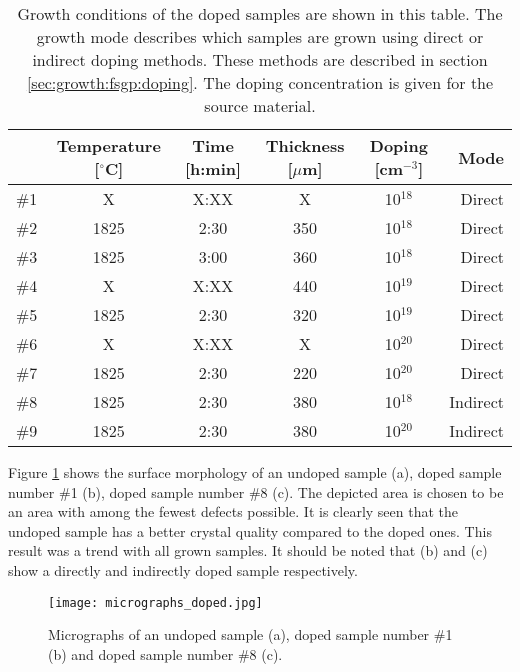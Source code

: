 \begin{table}[h]
\caption{Growth conditions of the doped samples are shown in this table. The growth mode describes which samples are grown using direct or indirect doping methods. These methods are described in section \ref{sec:growth:fsgp:doping}. The doping concentration is given for the source material.} 
\label{tab:doped_samples}
\begin{center}
\begin{tabular}{l c c c c r}
  \hline                       
  \hline       
  \vspace{1mm}
   & \small{Temperature [$^\circ$C]} & \small{Time [h:min]} & \small{Thickness [$\mu$m]} & \small{Doping [cm$^{-3}$]} & Mode\\
    \hline
  \#1 & X & X:XX & X & 10$^{18}$&Direct\\ %
  \#2 & 1825 & 2:30 & 350 & 10$^{18}$&Direct\\ %
  \#3 & 1825 & 3:00 & 360 & 10$^{18}$&Direct\\	%
  \#4 & X & X:XX & 440 & 10$^{19}$&Direct\\ %
  \#5 & 1825 & 2:30 & 320 & 10$^{19}$&Direct\\ %
  \#6 & X & X:XX & X & 10$^{20}$&Direct\\%
  \#7 & 1825 & 2:30 & 220 & 10$^{20}$&Direct\\%
  \#8 & 1825 & 2:30 & 380 & 10$^{18}$&Indirect\\%
  \#9 & 1825 & 2:30 & 380 & 10$^{20}$&Indirect\\%
  
  \hline  
\end{tabular}
\end{center}
\end{table}
 
Figure \ref{fig:B_doped_micrographs1} shows the surface morphology of an undoped sample (a), doped sample number \#1 (b), doped sample number \#8 (c). The depicted area is chosen to be an area with among the fewest defects possible. It is clearly seen that the undoped sample has a better crystal quality compared to the doped ones. This result was a trend with all grown samples. It should be noted that (b) and (c) show a directly and indirectly doped sample respectively. 

\begin{figure}[h]
\begin{center}
\texttt{[image: micrographs\_doped.jpg]}
\caption{Micrographs of an undoped sample (a), doped sample number \#1 (b) and doped sample number \#8 (c).
\label{fig:B_doped_micrographs1}}
\end{center}
\end{figure}

